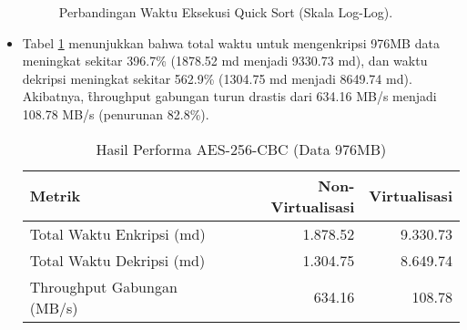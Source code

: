\begin{itemize}
    \begin{figure}[H]
        \centering
        \caption{Perbandingan Waktu Eksekusi Quick Sort (Skala Log-Log).}
        \label{fig:quick_sort_performance_jurnal_ui_ana}
    \end{figure}

    \item {} Tabel \ref{tab:aes_performance_jurnal_ui_ana} menunjukkan bahwa total waktu untuk mengenkripsi 976MB data meningkat sekitar 396.7\% (1878.52 md menjadi 9330.73 md), dan waktu dekripsi meningkat sekitar 562.9\% (1304.75 md menjadi 8649.74 md). Akibatnya, \f{throughput} gabungan turun drastis dari 634.16 MB/s menjadi 108.78 MB/s (penurunan 82.8\%).
    \begin{table}[H]
        \centering
        \caption{Hasil Performa AES-256-CBC (Data 976MB)}
        \label{tab:aes_performance_jurnal_ui_ana}
        \fontsize{12}{12}\selectfont %
        \begin{tabular}{@{}lrr@{}}
            \toprule
            \textbf{Metrik}              & \textbf{Non-Virtualisasi} & \textbf{Virtualisasi} \\
            \midrule
            Total Waktu Enkripsi (md)   & 1.878.52                 & 9.330.73             \\
            Total Waktu Dekripsi (md)   & 1.304.75                 & 8.649.74             \\
            Throughput Gabungan (MB/s)   & 634.16                   & 108.78               \\
            \bottomrule
        \end{tabular}
    \end{table}
\end{itemize}

